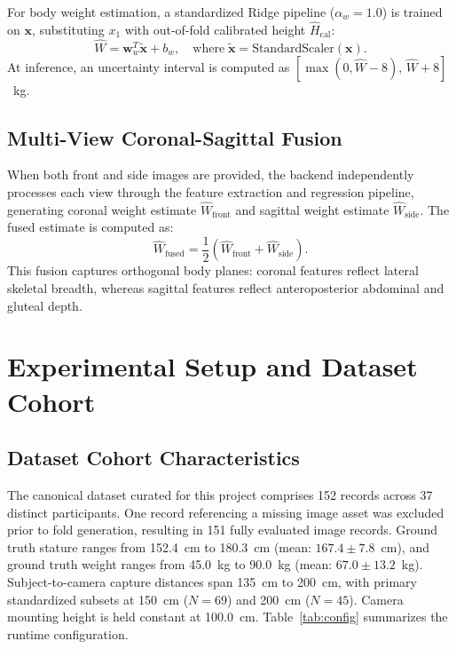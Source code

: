 \documentclass[conference]{IEEEtran}
\begin{document}
For body weight estimation, a standardized Ridge pipeline ($\alpha_w = 1.0$) is trained on $\mathbf{x}$, substituting $x_1$ with out-of-fold calibrated height $\widehat{H}_{\text{cal}}$:
\begin{equation}
\widehat{W} = \mathbf{w}_w^T \tilde{\mathbf{x}} + b_w, \quad \text{where} \; \tilde{\mathbf{x}} = \text{StandardScaler}(\mathbf{x}).
\end{equation}
At inference, an uncertainty interval is computed as $[\max(0, \widehat{W} - 8), \, \widehat{W} + 8]$~kg.

\subsection{Multi-View Coronal-Sagittal Fusion}
When both front and side images are provided, the backend independently processes each view through the feature extraction and regression pipeline, generating coronal weight estimate $\widehat{W}_{\text{front}}$ and sagittal weight estimate $\widehat{W}_{\text{side}}$. The fused estimate is computed as:
\begin{equation}
\widehat{W}_{\text{fused}} = \frac{1}{2} \left( \widehat{W}_{\text{front}} + \widehat{W}_{\text{side}} \right).
\label{eq:fusion}
\end{equation}
This fusion captures orthogonal body planes: coronal features reflect lateral skeletal breadth, whereas sagittal features reflect anteroposterior abdominal and gluteal depth.

\section{Experimental Setup and Dataset Cohort}
\subsection{Dataset Cohort Characteristics}
The canonical dataset curated for this project comprises 152 records across 37 distinct participants. One record referencing a missing image asset was excluded prior to fold generation, resulting in 151 fully evaluated image records. Ground truth stature ranges from 152.4~cm to 180.3~cm (mean: $167.4 \pm 7.8$~cm), and ground truth weight ranges from 45.0~kg to 90.0~kg (mean: $67.0 \pm 13.2$~kg). Subject-to-camera capture distances span 135~cm to 200~cm, with primary standardized subsets at 150~cm ($N=69$) and 200~cm ($N=45$). Camera mounting height is held constant at 100.0~cm. Table~\ref{tab:config} summarizes the runtime configuration.
\end{document}

